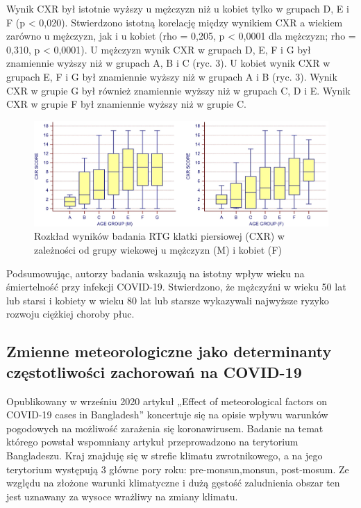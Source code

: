 \documentclass[polish, twoside, 12pt, a4paper]{article}
\theoremstyle{definition}
\theoremstyle{plain}
\theoremstyle{remark}
\begin{document}
Wynik CXR był istotnie wyższy u mężczyzn niż u kobiet tylko w grupach D, E i F (p < 0,020). Stwierdzono istotną korelację między wynikiem CXR a wiekiem zarówno u mężczyzn, jak i u kobiet (rho = 0,205, p < 0,0001 dla mężczyzn; rho = 0,310, p < 0,0001). U mężczyzn wynik CXR w grupach D, E, F i G był znamiennie wyższy niż w grupach A, B i C (ryc. 3). U kobiet wynik CXR w grupach E, F i G był znamiennie wyższy niż w grupach A i B (ryc. 3). Wynik CXR w grupie G był również znamiennie wyższy niż w grupach C, D i E. Wynik CXR w grupie F był znamiennie wyższy niż w grupie C.

\begin{figure}[h]
\centering
\includegraphics[width=15cm]{age-sex.jpg}
\caption{Rozkład wyników badania RTG klatki piersiowej (CXR) w zależności od grupy wiekowej u mężczyzn (M) i kobiet (F)}
\end{figure}

Podsumowując, autorzy badania wskazują na istotny wpływ wieku na śmiertelność przy infekcji COVID-19. Stwierdzono, że mężczyźni w wieku 50 lat lub starsi i kobiety w wieku 80 lat lub starsze wykazywali najwyższe ryzyko rozwoju ciężkiej choroby płuc. \cite{wang2020}

\subsection{Zmienne meteorologiczne jako determinanty częstotliwości zachorowań na COVID-19}

Opublikowany w wrześniu 2020 artykuł „Effect of meteorological factors on COVID-19 cases in Bangladesh” koncertuje się na opisie wpływu warunków pogodowych na możliwość zarażenia się koronawirusem. Badanie na temat którego powstał wspomniany artykuł przeprowadzono na terytorium Bangladeszu. Kraj znajduję się w strefie klimatu zwrotnikowego, a na jego terytorium występują 3 główne pory roku: pre-monsun,monsun, post-mosum. Ze względu na złożone warunki klimatyczne i dużą gęstość zaludnienia obszar ten jest uznawany za wysoce wrażliwy na zmiany klimatu.
\end{document}
